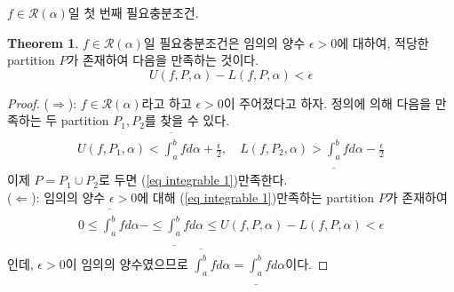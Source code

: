 \documentclass[12pt]{article}
\theoremstyle{definition}
\newtheorem{thm}{Theorem}[section]
\def\eps{\epsilon}
\def\calR{\mathcal{R}}
\begin{document}
\(f \in \calR(\alpha)\)일 첫 번째 필요충분조건.

\begin{thm} \label{thm integrable 1}
	\(f \in \calR(\alpha)\)일 필요충분조건은 임의의 양수 \(\eps > 0\)에 대하여, 적당한 partition \(P\)가 존재하여 다음을 만족하는 것이다.
	\begin{equation} \label{eq integrable 1}
		U(f, P, \alpha) - L(f, P, \alpha) < \eps
	\end{equation}
\end{thm}
\begin{proof}
	($\Rightarrow$): \(f \in \calR(\alpha)\)라고 하고 \(\eps > 0\)이 주어졌다고 하자. 정의에 의해 다음을 만족하는 두 partition \(P_1, P_2\)를 찾을 수 있다.
	\begin{gather*}
		U(f, P_1, \alpha) < \overline{\int_a^b} f d\alpha + \frac{\eps}{2}, \quad L(f, P_2, \alpha) > \underline{\int_a^b} f d\alpha - \frac{\eps}{2}
	\end{gather*}
	이제 \(P = P_1 \cup P_2\)로 두면 (\ref{eq integrable 1})\을 만족한다.\\
	($\Leftarrow$): 임의의 양수 \(\eps > 0\)에 대해 (\ref{eq integrable 1})\을 만족하는 partition \(P\)가 존재하여
	\begin{gather*}
		0 \le \overline{\int_a^b} f d\alpha - \le \underline{\int_a^b} f d\alpha \le U(f, P, \alpha) - L(f, P, \alpha) < \eps
	\end{gather*}
	인데, \(\eps > 0\)이 임의의 양수였으므로 \(\overline{\int_a^b} f d\alpha = \underline{\int_a^b} f d\alpha\)이다.
\end{proof}
\end{document}

